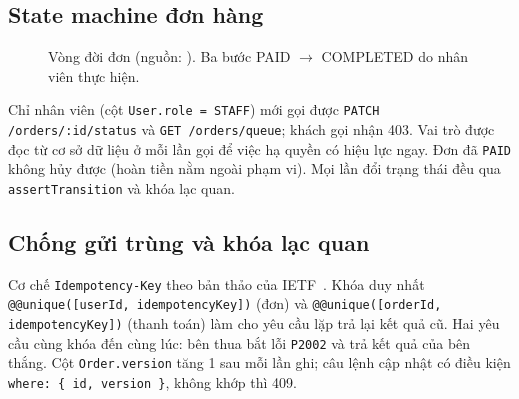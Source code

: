 \documentclass[12pt, a4paper]{article}
\begin{document}
\subsection{State machine đơn hàng}
\begin{figure}[H]\centering
{}
\caption{Vòng đời đơn (nguồn: ). Ba bước PAID $\rightarrow$ COMPLETED do nhân viên thực hiện.}
\end{figure}

Chỉ nhân viên (cột \texttt{User.role = STAFF}) mới gọi được \texttt{PATCH /orders/:id/status} và \texttt{GET /orders/queue};
khách gọi nhận 403. Vai trò được đọc từ cơ sở dữ liệu ở mỗi lần gọi để việc hạ quyền có hiệu lực ngay.
Đơn đã \texttt{PAID} không hủy được (hoàn tiền nằm ngoài phạm vi).
Mọi lần đổi trạng thái đều qua \texttt{assertTransition} và khóa lạc quan.

\subsection{Chống gửi trùng và khóa lạc quan}
Cơ chế \texttt{Idempotency-Key} theo bản thảo của IETF~\cite{idem}. Khóa duy nhất \texttt{@@unique([userId, idempotencyKey])} (đơn) và \texttt{@@unique([orderId, idempotencyKey])} (thanh toán)
làm cho yêu cầu lặp trả lại kết quả cũ. Hai yêu cầu cùng khóa đến cùng lúc: bên thua bắt lỗi \texttt{P2002} và trả kết quả của bên thắng.
Cột \texttt{Order.version} tăng 1 sau mỗi lần ghi; câu lệnh cập nhật có điều kiện \texttt{where: \{ id, version \}}, không khớp thì 409.
\end{document}
